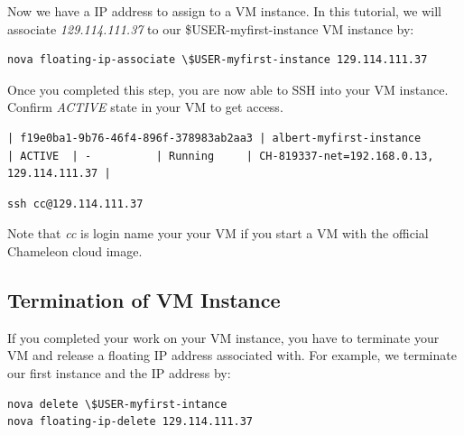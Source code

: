 Now we have a IP address to assign to a VM instance. In this tutorial,
we will associate \textit{129.114.111.37} to our
\$USER-myfirst-instance VM instance by:

\begin{lstlisting}
nova floating-ip-associate \$USER-myfirst-instance 129.114.111.37
\end{lstlisting}

Once you completed this step, you are now able to SSH into your VM
instance.  Confirm \textit{ACTIVE} state in your VM to get access.

\begin{lstlisting}
| f19e0ba1-9b76-46f4-896f-378983ab2aa3 | albert-myfirst-instance       | ACTIVE  | -          | Running     | CH-819337-net=192.168.0.13, 129.114.111.37 |
\end{lstlisting}


\begin{lstlisting}
ssh cc@129.114.111.37
\end{lstlisting}

Note that \textit{cc} is login name your your VM if you start a VM
with the official Chameleon cloud image.

\subsection{Termination of VM Instance}

If you completed your work on your VM instance, you have to terminate
your VM and release a floating IP address associated with. For
example, we terminate our first instance and the IP address by:

\begin{lstlisting}
nova delete \$USER-myfirst-intance
nova floating-ip-delete 129.114.111.37
\end{lstlisting}


